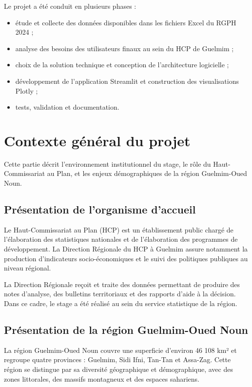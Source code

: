 \documentclass[12pt,a4paper,oneside]{report}
\begin{document}
Le projet a été conduit en plusieurs phases :

\begin{itemize}[leftmargin=*]
  \item étude et collecte des données disponibles dans les fichiers Excel du RGPH 2024 ;
  \item analyse des besoins des utilisateurs finaux au sein du HCP de Guelmim ;
  \item choix de la solution technique et conception de l'architecture logicielle ;
  \item développement de l'application Streamlit et construction des visualisations Plotly ;
  \item tests, validation et documentation.
\end{itemize}

\chapter{Contexte général du projet}

Cette partie décrit l'environnement institutionnel du stage, le rôle du Haut-Commissariat au Plan, et les enjeux démographiques de la région Guelmim-Oued Noun.

\section{Présentation de l'organisme d'accueil}

Le Haut-Commissariat au Plan (HCP) est un établissement public chargé de l'élaboration des statistiques nationales et de l'élaboration des programmes de développement. La Direction Régionale du HCP à Guelmim assure notamment la production d'indicateurs socio-économiques et le suivi des politiques publiques au niveau régional.

La Direction Régionale reçoit et traite des données permettant de produire des notes d'analyse, des bulletins territoriaux et des rapports d'aide à la décision. Dans ce cadre, le stage a été réalisé au sein du service statistique de la région.

\section{Présentation de la région Guelmim-Oued Noun}

La région Guelmim-Oued Noun couvre une superficie d'environ 46 108 km² et regroupe quatre provinces : Guelmim, Sidi Ifni, Tan-Tan et Assa-Zag. Cette région se distingue par sa diversité géographique et démographique, avec des zones littorales, des massifs montagneux et des espaces sahariens.
\end{document}
